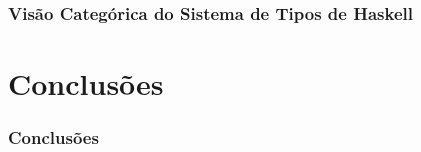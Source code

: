 \documentclass{beamer}
\begin{document}
  \begin{frame}
    \frametitle{Vis\~ao Categ\'orica do Sistema de Tipos de Haskell}
  \end{frame}

  \section{Conclus\~oes}
  \begin{frame}
    \frametitle{Conclus\~oes}
  \end{frame}
\end{document}
